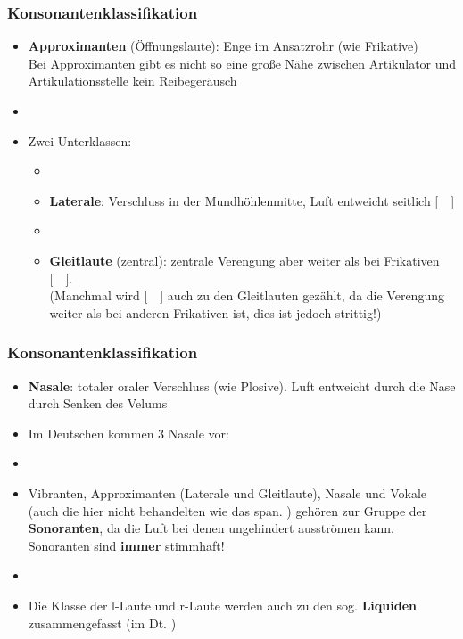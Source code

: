 
\begin{frame}
\frametitle{Konsonantenklassifikation}

		\begin{itemize}
			\item \textbf{Approximanten} (Öffnungslaute): Enge im Ansatzrohr (wie Frikative)\\
			Bei Approximanten gibt es nicht so eine große Nähe zwischen Artikulator und Artikulationsstelle \ras kein Reibegeräusch
			\item[]
			\item[] Zwei Unterklassen:
			
			\begin{itemize}
				\item[]
				\item \textbf{Laterale}: Verschluss in der Mundhöhlenmitte, Luft entweicht seitlich [~~]
				\item[]
				\item \textbf{Gleitlaute} (zentral): zentrale Verengung aber weiter als bei Frikativen [~~].\\
				(Manchmal wird [~~] auch zu den Gleitlauten gezählt, da die Verengung weiter als bei anderen Frikativen ist, dies ist jedoch strittig!)
			\end{itemize}
			
		\end{itemize}	

\end{frame}



\begin{frame}
\frametitle{Konsonantenklassifikation}

		\begin{itemize}
			\item \textbf{Nasale}: totaler oraler Verschluss (wie Plosive). Luft entweicht durch die Nase durch Senken des Velums\\
			\item[] Im Deutschen kommen 3 Nasale vor: \textipa{[ m, n, N ]}

		\item[]
		\item Vibranten, Approximanten (Laterale und Gleitlaute), Nasale und Vokale (auch die hier nicht behandelten  wie das span. \textipa{[ R ]}) gehören zur Gruppe der \textbf{Sonoranten}, da die Luft bei denen ungehindert ausströmen kann. Sonoranten sind \textbf{immer} stimmhaft!
		\item[]
		\item Die Klasse der l-Laute und r-Laute werden auch zu den sog. \textbf{Liquiden} zusammengefasst (im Dt. \textipa{[ l, r, \textscr ]})
	\end{itemize}
	
\end{frame}


